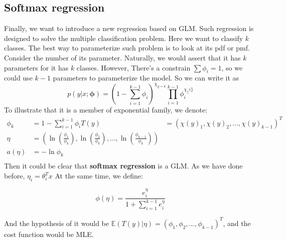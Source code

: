 \subsection{Softmax regression}
Finally, we want to introduce a new regression based on GLM. Such regression is designed to solve the multiple classification problem. Here we want to classify $k$ classes. 
The best way to parameterize such problem is to look at its pdf or pmf. Consider the number of its parameter. Naturally, we would assert that it has $k$ parameters for it has $k$ classes. However,
There's a constrain $\sum \phi_i = 1$, so we could use $k-1$ parameters to parameterize the model.
So we can write it as
\[p(y|x;\mathbf{\phi}) = \left(1-\sum_{i=1}^{k-1}\phi_i\right)^{\chi_{y=k}}\prod_{i=1}^{k-1} \phi_i^{\chi_\{i\}}\]
To illustrate that it is a member of exponential family, we denote:
\begin{align*}
    \phi_k &= 1 - \sum_{i=1}^{k-1} \phi_i 
    T(y) &= \left(\chi(y)_{1}, \chi(y)_{2}, \ldots, \chi(y)_{k-1}\right)^T\\
    \eta &= \left(\ln\left(\frac{\phi_1}{\phi_k}\right), \ln\left(\frac{\phi_2}{\phi_k}\right), \ldots, \ln\left(\frac{\phi_{k-1}}{\phi_k}\right)\right)\\
    a(\eta) &= -\ln\phi_k\\
\end{align*}
Then it could be clear that \textbf{softmax regression} is a GLM. As we have done before, $\eta_i = \theta_i^Tx$ At the same time, we define:
\begin{define}
    \[\phi(\eta) = \frac{e^\eta_i}{1+\sum_{i=1}^{k-1}e^\eta_i}\]
\end{define}
And the hypothesis of it would be $\mathbb{E}(T(y)|\eta) = (\phi_1,\phi_2,\ldots,\phi_{k-1})^T$, and the cost function would be MLE.

